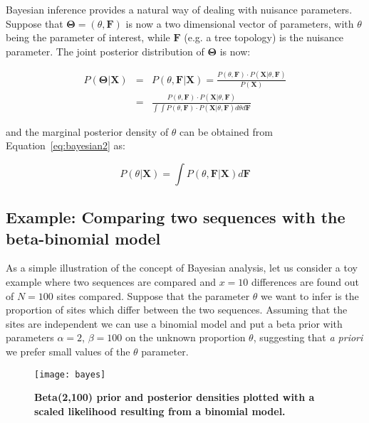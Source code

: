 Bayesian inference provides a natural way of dealing with nuisance parameters.
Suppose that $\mathbf{\Theta}=\left(\theta,\mathbf{F}\right)$ is now a two dimensional vector of parameters, with $\theta$ being the parameter of interest, while 
$\mathbf{F}$ (e.g. a tree topology) is the nuisance parameter.
The joint posterior distribution of $\mathbf{\Theta}$ is now:

\begin{eqnarray}
P\left(\mathbf{\Theta}|\mathbf{X}\right) &=& P\left(\theta,\mathbf{F}|\mathbf{X}\right)=\frac{P\left(\theta,\mathbf{F}\right)\cdot P\left(\mathbf{X}|\theta,\mathbf{F}\right)}{P\left(\mathbf{X}\right)}  \nonumber \\
&=& \frac{P\left(\theta,\mathbf{F}\right)\cdot P\left(\mathbf{X}|\theta,\mathbf{F}\right)}{\int\int P(\theta,\mathbf{F})\cdot P\left(\mathbf{X}|\theta,\mathbf{F}\right)d\theta d\mathbf{F}}
\label{eq:bayesian2}
\end{eqnarray}

\noindent
and the marginal posterior density of $\theta$ can be obtained from Equation~\ref{eq:bayesian2} as:

\begin{equation}
P\left(\theta|\mathbf{X}\right) =\int P\left(\theta,\mathbf{F}|\mathbf{X}\right)d\mathbf{F}
\label{eq:bayesian3}
\end{equation}

\subsection{Example: Comparing two sequences with the beta-binomial model}

As a simple illustration of the concept of Bayesian analysis, let us consider a toy example where two sequences are compared and $x=10$ differences are found out of $N=100$ sites compared.
Suppose that the parameter $\theta$ we want to infer is the proportion of sites which differ between the two sequences.
Assuming that the sites are independent we can use a binomial model and put a beta prior with parameters $\alpha=2$, $\beta=100$ on the unknown proportion $\theta$, suggesting that \textit{a priori} we prefer small values of the $\theta$ parameter.

\begin{figure}[H]
\centering
\texttt{[image: bayes]} 
\caption{
{ \footnotesize 
{\bf Beta(2,100) prior and posterior densities plotted with a scaled likelihood resulting from a binomial model.} 
}%
}
\label{fig:bayes1}
\end{figure}

